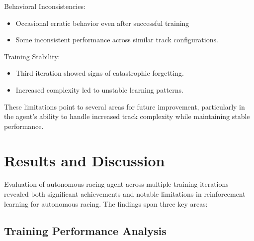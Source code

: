 \documentclass[10pt,twocolumn]{article}
\begin{document}
Behavioral Inconsistencies:
\begin{itemize}
    \item Occasional erratic behavior even after successful training
    \item Some inconsistent performance across similar track configurations.
\end{itemize}


Training Stability:
\begin{itemize}
    \item Third iteration showed signs of catastrophic forgetting.
    \item Increased complexity led to unstable learning patterns.
\end{itemize}

These limitations point to several areas for future improvement, particularly in the agent's ability to handle increased track complexity while maintaining stable performance.


\section{Results and Discussion}
Evaluation of autonomous racing agent across multiple training iterations revealed both significant achievements and notable limitations in reinforcement learning for autonomous racing. The findings span three key areas:
\subsection{Training Performance Analysis}
\end{document}

